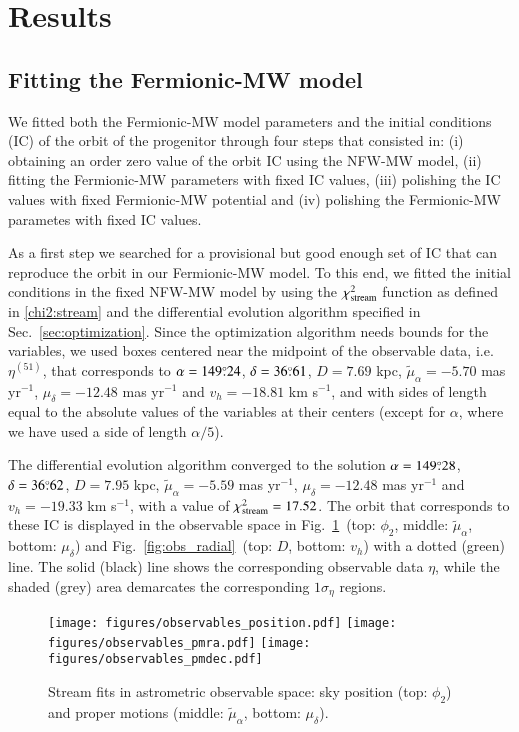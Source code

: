 \documentclass[twocolumn]{aa}
\begin{document}
\section{Results}
\label{sec:results}

\subsection{Fitting the Fermionic-MW model}
\label{sec:fitting}
We fitted both the Fermionic-MW model parameters and the initial conditions (IC) of the orbit of the progenitor through four steps that consisted in: (i) obtaining an order zero value of the orbit IC using the
NFW-MW model, (ii) fitting the Fermionic-MW parameters with fixed IC values, (iii) polishing the IC values with fixed Fermionic-MW potential and (iv) polishing the Fermionic-MW parametes with fixed IC values.

As a first step we searched for a provisional but good enough set of IC that can reproduce the orbit in our
Fermionic-MW model. To this end, we fitted the initial conditions in the fixed NFW-MW model by using the $\chi^2_{\rm{stream}}$ function as defined in \cref{chi2:stream}
and the differential evolution algorithm specified in Sec.~\ref{sec:optimization}. Since the optimization algorithm
needs bounds for the variables, we used boxes centered near the midpoint
of the observable data, i.e. $\eta^{(51)}$, that corresponds to $\alpha=149\overset{\circ}{.} 24$, $\delta=36\overset{\circ}{.} 61$, $D=7.69$ kpc, $\tilde{\mu}_\alpha=-5.70$ mas yr$^{-1}$, $\mu_\delta=-12.48$ mas yr$^{-1}$ and $v_h=-18.81$ km s$^{-1}$, and with sides of length equal to the absolute values of the variables at their centers (except for $\alpha$, where we have used a side of length $\alpha/5$).

The differential evolution algorithm converged to the solution
$\alpha=149\overset{\circ}{.} 28$, $\delta=36\overset{\circ}{.} 62$, $D=7.95$ kpc, $\tilde{\mu}_\alpha=-5.59$ mas yr$^{-1}$, $\mu_\delta=-12.48$ mas yr$^{-1}$ and $v_h=-19.33$ km s$^{-1}$, with a value of $\chi^2_{\rm{stream}}= 17.52$.
The orbit that corresponds to these IC is displayed in the observable space in Fig.~\ref{fig:obs_astrometry}~(top: $\phi_2$, middle: $\tilde{\mu}_\alpha$, bottom: $\mu_\delta$) and Fig.~\ref{fig:obs_radial}~(top: $D$, bottom: $v_h$) with a dotted (green) line. The solid (black) line shows the corresponding observable data $\eta$, while the shaded (grey) area demarcates the corresponding $1\sigma_\eta$ regions.
\begin{figure}
   \centering
   \texttt{[image: figures/observables\_position.pdf]}
   \texttt{[image: figures/observables\_pmra.pdf]}
   \texttt{[image: figures/observables\_pmdec.pdf]}
   \caption{Stream fits in astrometric observable space: sky position (top: $\phi_2$) and proper motions (middle: $\tilde{\mu}_\alpha$, bottom: $\mu_\delta$).}
   \label{fig:obs_astrometry}
\end{figure}
\end{document}
